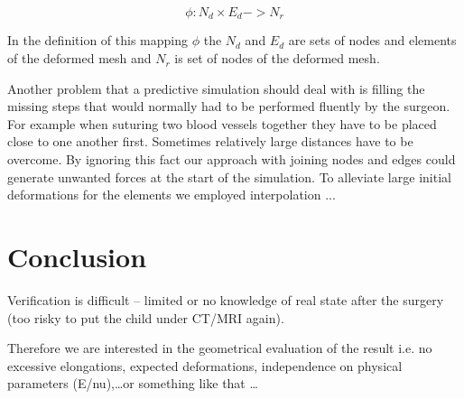 \documentclass[runningheads,a4paper]{llncs}
\newcommand{\tomas}[1]{{\color{red}{\textbf{Tom: #1}}}}
\begin{document}
\begin{equation}
  \phi : N_d \times E_d -> N_r
\end{equation}

In the definition of this mapping $\phi$ the $N_d$ and $E_d$ are sets of
nodes and elements of the deformed mesh and $N_r$ is set of nodes of the
deformed mesh.

\tomas{what more?}


Another problem that a predictive simulation should deal with is filling
the missing steps that would normally had to be performed fluently by the
surgeon. For example when suturing two blood vessels together they have to
be placed close to one another first. Sometimes relatively large distances
have to be overcome. By ignoring this fact our approach with joining nodes
and edges could generate unwanted forces at the start of the simulation. To
alleviate large initial deformations for the elements we employed
interpolation ...



\section{Conclusion}

Verification is difficult -- limited or no knowledge of real state after
the surgery (too risky to put the child under CT/MRI again). 

Therefore we are interested in the geometrical evaluation of the result
i.e. no excessive elongations, expected deformations, independence on
physical parameters (E/nu),\ldots or something like that \ldots




\end{document}
